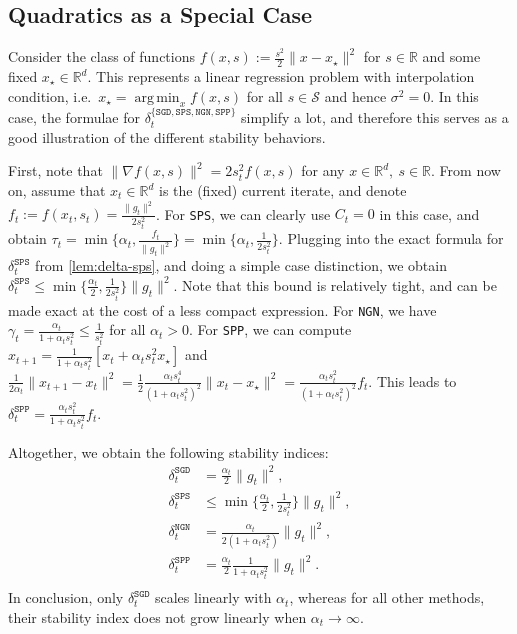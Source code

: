 \documentclass{article}
\DeclareMathOperator*{\argmin}{arg\,min}
\newcommand{\R}{\mathbb{R}}
\newcommand{\SPP}{{\texttt{SPP}}}
\newcommand{\NGN}{{\texttt{NGN}}}
\theoremstyle{plain}
\theoremstyle{definition}
\theoremstyle{remark}
\begin{document}

\subsection{Quadratics as a Special Case}\label{sec:app:quadratics}

Consider the class of functions $f(x,s):=\frac{s^2}{2}\|x-x_\star\|^2$ for $s\in \R$ and some fixed $x_\star \in \R^d$. This represents a linear regression problem with interpolation condition, i.e.\ $x_\star = \argmin_x f(x,s)$ for all $s\in \mathcal{S}$ and hence $\sigma^2=0$. In this case, the formulae for  $\delta_t^{\{\texttt{SGD},\texttt{SPS},\texttt{NGN},\texttt{SPP}\}}$ simplify a lot, and therefore this serves as a good illustration of the different stability behaviors.

First, note that $\|\nabla f(x,s)\|^2 = 2s_t^2f(x,s)$ for any $x\in\R^d,~s\in\R$. From now on, assume that $x_t\in \R^d$ is the (fixed) current iterate, and denote $f_t:=f(x_t,s_t) = \frac{\|g_t\|^2}{2s_t^2}$. For \texttt{SPS},  we can clearly use $C_t=0$ in this case, and obtain $\tau_t = \min\{\alpha_t, \frac{f_t}{\|g_t\|^2}\} = \min\{\alpha_t, \frac{1}{2s_t^2}\}$. Plugging into the exact formula for $\delta_t^{\texttt{SPS}}$ from \cref{lem:delta-sps}, and doing a simple case distinction, we obtain $\delta_t^{\texttt{SPS}} \leq \min\{\frac{\alpha_t}{2}, \frac{1}{2s_t^2}\}\|g_t\|^2$. Note that this bound is relatively tight, and can be made exact at the cost of a less compact expression.
%
For \NGN{}, we have $\gamma_t = \frac{\alpha_t}{1+\alpha_ts_t^2} \leq \frac{1}{s_t^2}$ for all $\alpha_t > 0$.
%
For \SPP{}, we can compute $x_{t+1} = \frac{1}{1+\alpha_t s_t^2}[x_t + \alpha_ts_t^2x_\star]$ and $\frac{1}{2\alpha_t}\|x_{t+1}-x_t\|^2 = \frac12 \frac{\alpha_ts_t^4}{(1+\alpha_ts_t^2)^2}\|x_t-x_\star\|^2 =  \frac{\alpha_t s_t^2}{(1+\alpha_ts_t^2)^2}f_t$. This leads to $\delta_t^{\texttt{SPP}} = \frac{\alpha_ts_t^2}{1+\alpha_ts_t^2}f_t$.


Altogether, we obtain the following stability indices:
\begin{align*}
    \delta_t^{\texttt{SGD}} &= \frac{\alpha_t}{2}\|g_t\|^2, \\
    \delta_t^{\texttt{SPS}} &\leq \min\{\frac{\alpha_t}{2}, \frac{1}{2s_t^2}\}\|g_t\|^2, \\
    \delta_t^{\texttt{NGN}} &= \frac{\alpha_t}{2(1+\alpha_ts_t^2)}\|g_t\|^2, \\
    \delta_t^{\texttt{SPP}} &= \frac{\alpha_t}{2}\frac{1}{1+\alpha_ts_t^2}\|g_t\|^2. \\
\end{align*}
In conclusion, only $\delta_t^{\texttt{SGD}}$ scales linearly with $\alpha_t$, whereas for all other methods, their stability index does not grow linearly when $\alpha_t\to \infty$.
\end{document}
